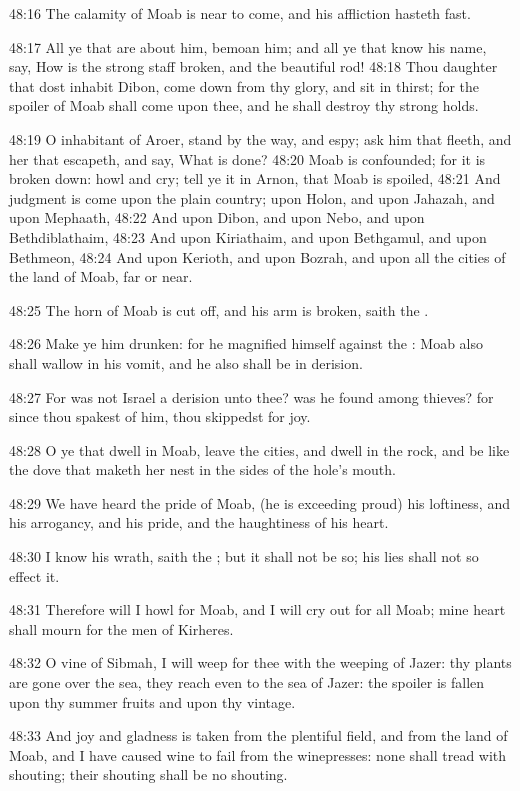 48:16 The calamity of Moab is near to come, and his affliction hasteth fast.

48:17 All ye that are about him, bemoan him; and all ye that know his name, say, How is the strong staff broken, and the beautiful rod!  48:18 Thou daughter that dost inhabit Dibon, come down from thy glory, and sit in thirst; for the spoiler of Moab shall come upon thee, and he shall destroy thy strong holds.

48:19 O inhabitant of Aroer, stand by the way, and espy; ask him that fleeth, and her that escapeth, and say, What is done?  48:20 Moab is confounded; for it is broken down: howl and cry; tell ye it in Arnon, that Moab is spoiled, 48:21 And judgment is come upon the plain country; upon Holon, and upon Jahazah, and upon Mephaath, 48:22 And upon Dibon, and upon Nebo, and upon Bethdiblathaim, 48:23 And upon Kiriathaim, and upon Bethgamul, and upon Bethmeon, 48:24 And upon Kerioth, and upon Bozrah, and upon all the cities of the land of Moab, far or near.

48:25 The horn of Moab is cut off, and his arm is broken, saith the \LORD.

48:26 Make ye him drunken: for he magnified himself against the \LORD: Moab also shall wallow in his vomit, and he also shall be in derision.

48:27 For was not Israel a derision unto thee? was he found among thieves?  for since thou spakest of him, thou skippedst for joy.

48:28 O ye that dwell in Moab, leave the cities, and dwell in the rock, and be like the dove that maketh her nest in the sides of the hole's mouth.

48:29 We have heard the pride of Moab, (he is exceeding proud) his loftiness, and his arrogancy, and his pride, and the haughtiness of his heart.

48:30 I know his wrath, saith the \LORD; but it shall not be so; his lies shall not so effect it.

48:31 Therefore will I howl for Moab, and I will cry out for all Moab; mine heart shall mourn for the men of Kirheres.

48:32 O vine of Sibmah, I will weep for thee with the weeping of Jazer: thy plants are gone over the sea, they reach even to the sea of Jazer: the spoiler is fallen upon thy summer fruits and upon thy vintage.

48:33 And joy and gladness is taken from the plentiful field, and from the land of Moab, and I have caused wine to fail from the winepresses: none shall tread with shouting; their shouting shall be no shouting.

